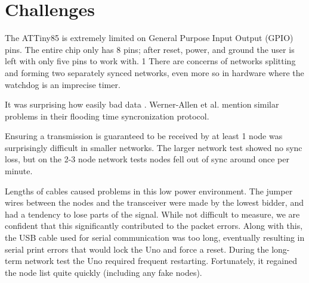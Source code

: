 \section{Challenges}
\label{section:challenges}

The ATTiny85 is extremely limited on General Purpose Input Output (GPIO) pins. The entire chip only has 8 pins; after reset, power, and ground the user is left with only five pins to work with. 1
There are concerns of networks splitting and forming two separately synced networks, even more so in hardware where the watchdog is an imprecise timer. 

It was surprising how easily bad data . Werner-Allen et al. mention similar problems in their flooding time syncronization protocol. 

Ensuring a transmission is guaranteed to be received by at least 1 node was surprisingly difficult in smaller networks. The larger network test showed no sync loss, but on the 2-3 node network tests nodes fell out of sync around once per minute.

Lengths of cables caused problems in this low power environment. The jumper wires between the nodes and the transceiver were made by the lowest bidder, and had a tendency to lose parts of the signal. While not difficult to measure, we are confident that this significantly contributed to the packet errors. Along with this, the USB cable used for serial communication was too long, eventually resulting in serial print errors that would lock the Uno and force a reset. During the long-term network test the Uno required frequent restarting. Fortunately, it regained the node list quite quickly (including any fake nodes).